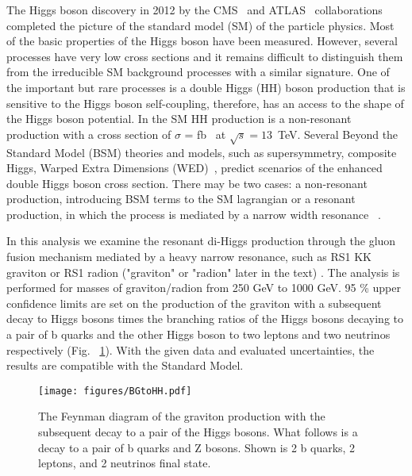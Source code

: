 The Higgs boson discovery in 2012 by the CMS~\cite{HiggsCMS} and
ATLAS~\cite{HiggsAtlas} collaborations completed the picture of the
standard model
(SM) \cite{Salam:1961en,Glashow:1961tr,Weinberg:1967tq}
of the particle physics. Most of the basic properties of the Higgs
boson have been measured. However, several processes have very low
cross sections and it remains difficult to distinguish them from the
irreducible SM background processes with a similar signature. One of
the important but rare processes is a double Higgs (HH) boson
production that is sensitive to the Higgs boson self-coupling, therefore, 
has an access to the shape of the Higgs boson potential. In the SM HH
production is a non-resonant production with a cross section of $\sigma$
=  fb~\cite{HHXsec} at $\sqrt{s}=13$~TeV. Several Beyond the Standard
Model (BSM) theories and models, such as supersymmetry, composite Higgs, Warped Extra Dimensions (WED)~\cite{Dolan:2012ac, Huang:2017nnw, Kanemura:2016tan, Oliveira:2014kla, WED}, predict scenarios of the enhanced double Higgs boson
cross section.
There may be two cases: a non-resonant production,
introducing BSM terms to the SM lagrangian or a resonant production,
in which the process is mediated by a narrow width resonance
~\cite{WED}. %
\vspace{1em} %

In this analysis we examine the resonant di-Higgs production
through the gluon fusion mechanism mediated by a heavy narrow
resonance, such as RS1 KK graviton or RS1 radion ("graviton" or "radion" later in the text) \cite{BG1,BG2,BG3}. The analysis is performed for
masses of graviton/radion from 250 GeV to 1000 GeV. 95 \% upper confidence
limits are set on the production of the graviton with a subsequent
decay to Higgs bosons times the branching ratios of the Higgs
bosons decaying to a pair of b quarks and the other Higgs boson to two
leptons and two neutrinos respectively (Fig. ~\ref{fig:BGtoHH}). With the given data and
evaluated uncertainties, the results are compatible with the Standard
Model.


\begin{figure}[!htb]%
  \begin{center}
    \texttt{[image: figures/BGtoHH.pdf]}
    \caption{ The Feynman diagram of the graviton production with the subsequent decay to a pair of the Higgs bosons. What follows is a decay to a pair of b quarks and Z bosons. Shown is 2 b quarks, 2 leptons, and 2 neutrinos final state.
    }
    \label{fig:BGtoHH}
  \end{center}
\end{figure}


